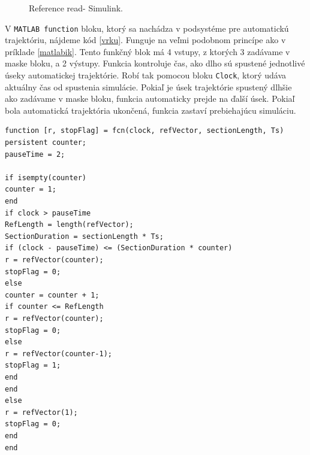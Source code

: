 \begin{figure}[!tbh]
	\hfill
	\hfill
	\hfill
	\caption{Reference read- Simulink.}\label{OBRAZOK 2.6.5}
\end{figure}

V \verb|MATLAB function| bloku, ktorý sa nachádza v podsystéme pre automatickú trajektóriu, nájdeme kód \ref{vrku}. Funguje na veľmi podobnom princípe ako v príklade \ref{matlabik}. Tento funkčný blok má 4 vstupy, z ktorých 3 zadávame v maske bloku, a 2 výstupy. Funkcia kontroluje čas, ako dlho sú spustené jednotlivé úseky automatickej trajektórie. Robí tak pomocou bloku \verb|Clock|, ktorý udáva aktuálny čas od spustenia simulácie. Pokiaľ je úsek trajektórie spustený dlhšie ako zadávame v maske bloku, funkcia automaticky prejde na ďalší úsek. Pokiaľ bola automatická trajektória ukončená, funkcia zastaví prebiehajúcu simuláciu. 



\begin{lstlisting}[caption={MATLAB function blok autiomatická trajektoria.},captionpos=b, label=vrku]
function [r, stopFlag] = fcn(clock, refVector, sectionLength, Ts)
persistent counter;
pauseTime = 2;

if isempty(counter)
counter = 1;
end
if clock > pauseTime
RefLength = length(refVector);
SectionDuration = sectionLength * Ts;
if (clock - pauseTime) <= (SectionDuration * counter)
r = refVector(counter);
stopFlag = 0;
else
counter = counter + 1;
if counter <= RefLength
r = refVector(counter);
stopFlag = 0;
else
r = refVector(counter-1);
stopFlag = 1; 
end
end
else
r = refVector(1);
stopFlag = 0;
end
end
\end{lstlisting}

